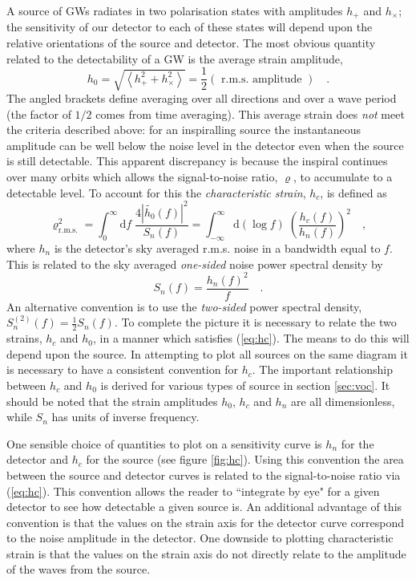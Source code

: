 \documentclass[fleqn,12pt]{iopart}
\begin{document}
A source of GWs radiates in two polarisation states with amplitudes $h_{+}$ and $h_{\times}$; the sensitivity of our detector to each of these states will depend upon the relative orientations of the source and detector. The most obvious quantity related to the detectability of a GW is the average strain amplitude,
\begin{equation}\label{eq:h0} h_{0}=\sqrt{\left< h_{+}^{2}+h_{\times}^{2} \right>}=\frac{1}{2}\left( \textrm{ r.m.s. amplitude } \right) \quad.\end{equation}
The angled brackets define averaging over all directions and over a wave period (the factor of $1/2$ comes from time averaging). This average strain does \emph{not} meet the criteria described above: for an inspiralling source the instantaneous amplitude can be well below the noise level in the detector even when the source is still detectable. This apparent discrepancy is because the inspiral continues over many orbits which allows the signal-to-noise ratio, $\varrho$, to accumulate to a detectable level. To account for this the \emph{characteristic strain}, $h_{c}$, is defined as
\begin{equation}\label{eq:hc} 
\varrho_{\textrm{r.m.s.}}^{2}= \int_{0}^{\infty}\textrm{d}f\; \frac{4\left|\tilde{h_{0}}(f)\right|^{2}}{S_{n}(f)} =\int_{-\infty}^{\infty} \textrm{d}\left(\log f\right)\; \left(\frac{h_{c}(f)}{h_{n}(f)}\right)^{2} \quad,
\end{equation}
where $h_{n}$ is the detector's sky averaged r.m.s. noise in a bandwidth equal to $f$. This is related to the sky averaged \emph{one-sided} noise power spectral density by
\begin{equation}\label{eq:powerspectraldensity} S_{n}(f)=\frac{h_{n}(f)^{2}}{f} \quad . \end{equation}
An alternative convention is to use the \emph{two-sided} power spectral density, $S^{(2)}_{n}(f)=\frac{1}{2}S_{n}(f)$. To complete the picture it is necessary to relate the two strains, $h_{c}$ and $h_{0}$, in a manner which satisfies (\ref{eq:hc}). The means to do this will depend upon the source. In attempting to plot all sources on the same diagram it is necessary to have a consistent convention for $h_{c}$. The important relationship between $h_{c}$ and $h_{0}$ is derived for various types of source in section \ref{sec:voc}. It should be noted that the strain amplitudes $h_{0}$, $h_{c}$ and $h_{n}$ are all dimensionless, while $S_{n}$ has units of inverse frequency. 

One sensible choice of quantities to plot on a sensitivity curve is $h_{n}$ for the detector and $h_{c}$ for the source (see figure \ref{fig:hc}). Using this convention the area between the source and detector curves is related to the signal-to-noise ratio via (\ref{eq:hc}). This convention allows the reader to ``integrate by eye" for a given detector to see how detectable a given source is. An additional advantage of this convention is that the values on the strain axis for the detector curve correspond to the noise amplitude in the detector. One downside to plotting characteristic strain is that the values on the strain axis do not directly relate to the amplitude of the waves from the source.
\end{document}
